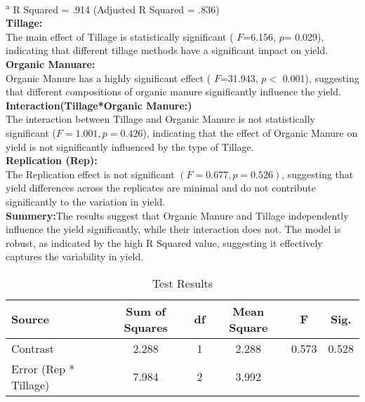 \documentclass[oneside,12pt,fleqn]{book}
\begin{document}
\noindent \textsuperscript{a} R Squared = .914 (Adjusted R Squared = .836)\\
\textbf{Tillage:}\\
The main effect of Tillage is statistically significant (
$F$=6.156, $p$=
0.029), indicating that different tillage methods have a significant impact on yield.\\
\textbf{Organic Manuare:}\\
Organic Manure has a highly significant effect ( $F$=31.943, $p<$
0.001), suggesting that different compositions of organic manure significantly influence the yield.\\
\textbf{Interaction(Tillage*Organic Manure:)}\\
The interaction between Tillage and Organic Manure is not statistically significant ($F=1.001, p= 0.426$), indicating that the effect of Organic Manure on yield is not significantly influenced by the type of Tillage.\\
\textbf{Replication (Rep):}\\
The Replication effect is not significant $(
F=0.677,p=0.526)$, suggesting that yield differences across the replicates are minimal and do not contribute significantly to the variation in yield.\\
\textbf{Summery:}The results suggest that Organic Manure and Tillage independently influence the yield significantly, while their interaction does not. The model is robust, as indicated by the high R Squared value, suggesting it effectively captures the variability in yield.


\newpage

\begin{table}[h]
    \centering
    \caption{Test Results}
    \begin{tabular}{lccccc}
    \toprule
    \textbf{Source} & \textbf{Sum of Squares} & \textbf{df} & \textbf{Mean Square} & \textbf{F} & \textbf{Sig.} \\
    \midrule
        Contrast & 2.288 & 1 & 2.288 & 0.573 & 0.528 \\
        Error (Rep * Tillage) & 7.984 & 2 & 3.992 & & \\
    \bottomrule
    \end{tabular}
\end{table}


\end{document}
